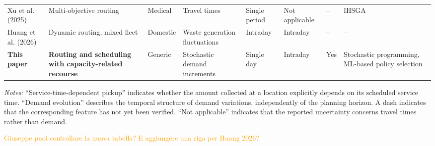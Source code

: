 \documentclass[authoryear,preprint,12pt]{elsarticle}
\newcommand{\sm}[1]{\textcolor{orange}{{#1}}}
\begin{document}
\begin{table}
\begin{tabular}{p{2.7cm} p{3.2cm} p{2.1cm} p{2.2cm} p{1.7cm} p{2.2cm} p{1.8cm} p{2.0cm}}
Xu et al. (2025) &
Multi-objective routing &
Medical &
Travel times &
Single period &
Not applicable &
-- &
IHSGA \\

Huang et al. (2026) &
Dynamic routing, mixed fleet &
Domestic &
Waste generation fluctuations &
Intraday &
Intraday &
-- &
-- \\

\midrule

\textbf{This paper} &
\textbf{Routing and scheduling with capacity-related recourse} &
Generic &
Stochastic demand increments &
Single day &
Intraday &
Yes &
Stochastic programming, ML-based policy selection \\

\bottomrule
\end{tabular}

\vspace{2mm}
\begin{minipage}{0.95\textwidth}
\footnotesize
\textit{Notes:} ``Service-time-dependent pickup'' indicates whether the amount collected at a location explicitly depends on its scheduled service time. ``Demand evolution'' describes the temporal structure of demand variations, independently of the planning horizon. A dash indicates that the corresponding feature has not yet been verified. ``Not applicable'' indicates that the reported uncertainty concerns travel times rather than demand.
\end{minipage}

\end{table}

\sm{Giuseppe puoi controllare la nuova tabella? E aggiungere una riga per Huang 2026?}
\end{document}
